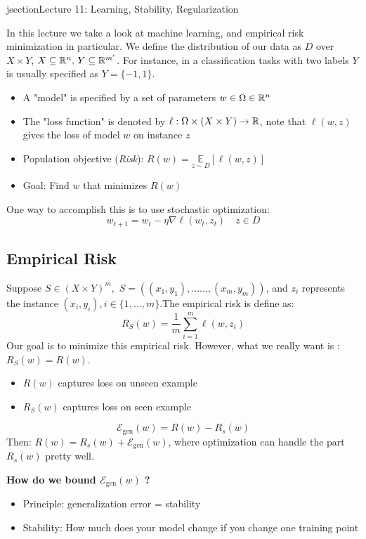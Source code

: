 jsection{Lecture 11: Learning, Stability, Regularization
}

In this lecture we take a look at machine learning, and empirical risk minimization in particular. We define the distribution of our data as $D$ over $X\times Y$, $X\subseteq \mathbb{R}^{n}, \,Y \subseteq \mathbb{R}^{m^{\prime}}$. For instance, in a classification tasks with two labels $Y$ is usually specified as $ Y = \{ -1,1 \}$.
\begin{itemize}
\item A "model" is specified by a set of parameters $w \in \Omega \in \mathbb{R}^{n}$
\item The "loss function" is denoted by $\ell: \Omega \times (X\times Y) \rightarrow \mathbb{R}$, note that $\ell(w,z)$ gives the loss of model $w$ on instance $z$
\item Population objective (\textit{Risk}): $R(w)=\underset{z\sim D}{\mathbb{E}}[\ell(w,z)]$
\item Goal: Find $w$ that minimizes $R(w)$
\end{itemize}

One way to accomplish this is to use stochastic optimization:
$$w_{t+1} = w_{t} - \eta \nabla \ell(w_t,z_t) \quad z\in D $$
\subsection{Empirical Risk}
Suppose $S\in (X \times Y)^{m}, \,\, S=((x_1,y_1),......,(x_m,y_m))$, and $z_i$ represents the instance $(x_i,y_i), i\in \{1, ...,m \}$.The empirical risk is define as:
$$R_{S}(w) = \frac{1}{m}\sum_{i=1}^{m}\ell(w,z_i)$$
Our goal is to minimize this empirical risk. However, what we really want is : $R_{S}(w) = R(w)$.
\begin{itemize}
\item $R(w)$ captures loss on unseen example 
\item $R_S(w)$ captures loss on seen example
\end{itemize}
\begin{definition}
$$\mathcal{E}_{\text{gen}}(w) = R(w) - R_{s}(w)$$
Then: $R(w) = R_{s}(w) + \mathcal{E}_{\text{gen}}(w)$, where optimization can handle the part $R_{s}(w)$ pretty well.
\end{definition}
\textbf{How do we bound $\mathcal{E}_{\text{gen}}(w)$ ?}
\begin{itemize}
\item Principle: generalization error = stability
\item Stability: How much does your model change if you change one training point
\end{itemize}

